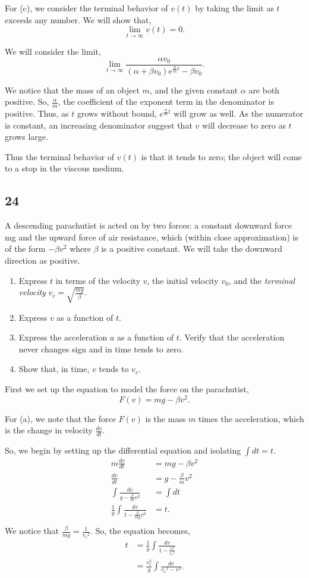 \documentclass[../hw11]{subfiles}
\begin{document}
For (c), we consider the terminal behavior of $v(t)$ by taking the limit as $t$ exceeds any number. We will show that,
\[\lim\limits_{t\to\infty}v(t)=0.\]

We will consider the limit,
\[\lim\limits_{t\to\infty}\frac{\alpha v_0}{(\alpha+\beta v_0)e^{\frac{\alpha}{m}t}-\beta v_0}.\]

We notice that the mass of an object $m$, and the given constant $\alpha$ are both positive. So, $\frac{\alpha}{m}$, the coefficient of the exponent term in the denominator is positive. Thus, as $t$ grows without bound, $e^{\frac{\alpha}{m}t}$ will grow as well. As the numerator is constant, an increasing denominator suggest that $v$ will decrease to zero as $t$ grows large.

Thus the terminal behavior of $v(t)$ is that it tends to zero; the object will come to a stop in the viscous medium.


\subsection*{24}
A descending parachutist is acted on by two forces: a constant downward force mg and the upward force of air resistance, which (within close approximation) is of the form $-\beta v^2$ where $\beta$ is a positive constant. We will take the downward direction as positive.

\begin{enumerate}[label= (\alph*)]
    \item Express $t$ in terms of the velocity $v$, the initial velocity $v_0$, and the \textit{terminal velocity} $v_c=\sqrt{\frac{mg}{\beta}}$.
    \item Express $v$ as a function of $t$.
    \item Express the acceleration $a$ as a function of $t$. Verify that the acceleration never changes sign and in time tends to zero.
    \item Show that, in time, $v$ tends to $v_c$.
\end{enumerate}

First we set up the equation to model the force on the parachutist,
\[F(v)=mg-\beta v^2.\]
 
For (a), we note that the force $F(v)$ is the mass $m$ times the acceleration, which is the change in velocity $\frac{dv}{dt}$.

So, we begin by setting up the differential equation and isolating $\int dt = t$.
\begin{align*}
    m\frac{dv}{dt}&=mg-\beta v^2 \\
    \frac{dv}{dt}&=g-\frac{\beta}{m} v^2 \\
    \int \frac{dv}{g-\frac{\beta}{m} v^2} &= \int dt \\
    \frac{1}{g} \int \frac{dv}{1-\frac{\beta}{mg} v^2} &= t. \\
\end{align*}
We notice that $\frac{\beta}{mg}=\frac{1}{{v_c}^2}$. So, the equation becomes,
\begin{align*}
    t &= \frac{1}{g}\int \frac{dv}{1-\frac{v^2}{{v_c}^2}} \\
    &= \frac{{v_c^2}}{g} \int \frac{dv}{{v_c}^2-v^2}.
\end{align*}
\end{document}
